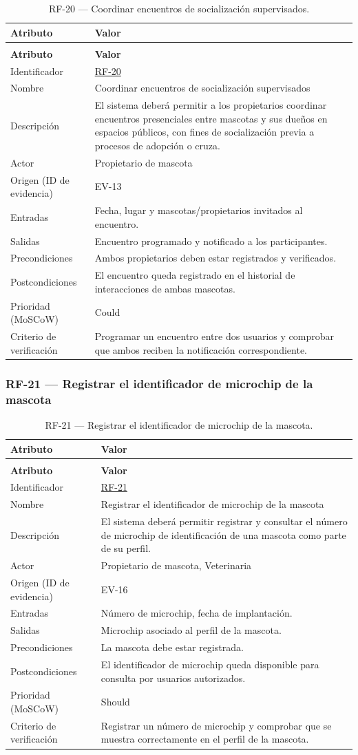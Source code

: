 \documentclass[journal,onecolumn]{IEEEtran}
\makeatletter
\newenvironment{atributos}[2]{%
	\small
	\begin{longtable}{@{}>{\raggedright\arraybackslash}p{4.2cm} >{\raggedright\arraybackslash}p{11.2cm}@{}}
		\caption{#2}\label{tab:#1}\\
		\toprule
		\textbf{Atributo} & \textbf{Valor} \\
		\midrule
		\endfirsthead
		\multicolumn{2}{@{}l}{\small\itshape (continuación)}\\
		\toprule
		\textbf{Atributo} & \textbf{Valor} \\
		\midrule
		\endhead
		\bottomrule
		\endlastfoot
	}{%
	\end{longtable}
	\normalsize
}
\makeatother
\begin{document}
	\begin{atributos}{RF-20}{RF-20 --- Coordinar encuentros de socialización supervisados.}
		Identificador & \hyperref[tab:RF-20]{RF-20} \\
		Nombre & Coordinar encuentros de socialización supervisados \\
		Descripción & El sistema deberá permitir a los propietarios coordinar encuentros presenciales entre mascotas y sus dueños en espacios públicos, con fines de socialización previa a procesos de adopción o cruza. \\
		Actor & Propietario de mascota \\
		Origen (ID de evidencia) & EV-13 \\
		Entradas & Fecha, lugar y mascotas/propietarios invitados al encuentro. \\
		Salidas & Encuentro programado y notificado a los participantes. \\
		Precondiciones & Ambos propietarios deben estar registrados y verificados. \\
		Postcondiciones & El encuentro queda registrado en el historial de interacciones de ambas mascotas. \\
		Prioridad (MoSCoW) & Could \\
		Criterio de verificación & Programar un encuentro entre dos usuarios y comprobar que ambos reciben la notificación correspondiente. \\
	\end{atributos}
	
	\subsubsection{RF-21 --- Registrar el identificador de microchip de la mascota}
	
	\begin{atributos}{RF-21}{RF-21 --- Registrar el identificador de microchip de la mascota.}
		Identificador & \hyperref[tab:RF-21]{RF-21} \\
		Nombre & Registrar el identificador de microchip de la mascota \\
		Descripción & El sistema deberá permitir registrar y consultar el número de microchip de identificación de una mascota como parte de su perfil. \\
		Actor & Propietario de mascota, Veterinaria \\
		Origen (ID de evidencia) & EV-16 \\
		Entradas & Número de microchip, fecha de implantación. \\
		Salidas & Microchip asociado al perfil de la mascota. \\
		Precondiciones & La mascota debe estar registrada. \\
		Postcondiciones & El identificador de microchip queda disponible para consulta por usuarios autorizados. \\
		Prioridad (MoSCoW) & Should \\
		Criterio de verificación & Registrar un número de microchip y comprobar que se muestra correctamente en el perfil de la mascota. \\
	\end{atributos}
	
\end{document}
